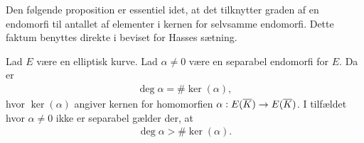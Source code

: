 Den følgende proposition er essentiel idet, at det tilknytter graden af en endomorfi til antallet af elementer i kernen for selvsamme endomorfi. Dette faktum benyttes direkte i beviset for Hasses sætning.

\begin{proposition}
\label{deg_to_ker}
Lad $E$ være en elliptisk kurve. Lad $\alpha \neq 0$ være en separabel 
endomorfi for $E$. Da er 
\begin{align*}
	\deg \alpha = \# \ker (\alpha),
\end{align*}
hvor $\ker (\alpha)$ angiver kernen for homomorfien 
$\alpha : E(\overline{K}) \to E(\overline{K})$. I tilfældet hvor $\alpha \neq 0$ ikke
er separabel gælder der, at 
\begin{align*}
	\deg \alpha > \# \ker (\alpha).
\end{align*}
\end{proposition}
